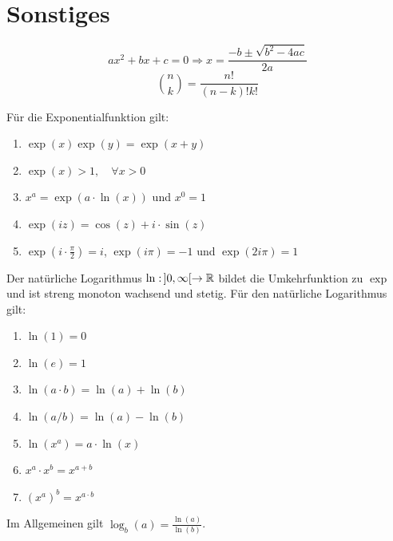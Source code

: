\section*{Sonstiges}



$$ax^2 + bx + c = 0 \Rightarrow x = \frac{-b \pm \sqrt{b^2 - 4ac}}{2a}$$
$$\binom{n}{k} = \frac{n!}{(n-k)!k!}$$






Für die Exponentialfunktion gilt:
\begin{enumerate}[label = (\arabic*)]
	\item $\exp(x) \exp(y) = \exp(x+y)$
	\item $\exp(x) > 1, \quad \forall x > 0$
	\item $x^a = \exp(a \cdot \ln(x))$ und $x^0 = 1$
	\item $\exp(iz) = \cos(z) + i \cdot \sin(z)$
	\item $\exp(i \cdot \frac{\pi}{2}) = i$, $\exp(i \pi) = -1$ und $\exp(2 i \pi) = 1$
\end{enumerate}

Der natürliche Logarithmus $\ln : \, ]0, \infty[ \to \mathbb{R}$ bildet die Umkehrfunktion zu $\exp$ und ist
streng monoton wachsend und stetig. Für den natürliche Logarithmus gilt:

\begin{enumerate}[label = (\arabic*)]
	\item $\ln(1) = 0$
	\item $\ln(e) = 1$
	\item $\ln(a \cdot b) = \ln(a) + \ln(b)$
	\item $\ln(a / b) = \ln(a) - \ln(b)$
	\item $\ln(x^a) = a \cdot \ln(x)$
	\item $x^a \cdot x^b = x^{a + b}$
	\item $(x^a)^b = x^{a \cdot b}$
\end{enumerate}

Im Allgemeinen gilt $\log_b(a) = \frac{\ln(a)}{\ln(b)}$.



